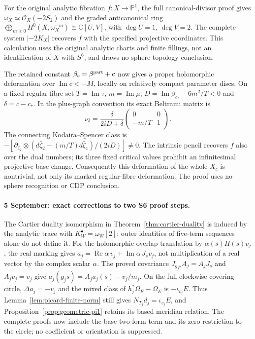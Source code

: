 For the original analytic fibration $f:X\to\mathbb P^1$, the full
canonical-divisor proof gives
$\omega_X\simeq\mathcal O_X(-2S_2)$ and the graded anticanonical ring
$\bigoplus_{m\ge0}H^0(X,\omega_X^{-m})\cong\mathbb C[U,V]$,
with $\deg U=1$, $\deg V=2$. The complete system $|-2K_X|$
recovers $f$ with the specified projective coordinates. This calculation
uses the original analytic charts and finite fillings, not an
identification of $X$ with $S^6$, and draws no sphere-topology conclusion.

The retained constant $\beta_c=\beta^{\rm part}+c$ now gives a proper
holomorphic deformation over $\operatorname{Im}c<-M$, locally on
relatively compact parameter discs. On a fixed regular fibre set
$T=\operatorname{Im}\tau$, $m=\operatorname{Im}\mu$,
$D=\operatorname{Im}\beta_{c_*}-6m^2/T<0$ and $\delta=c-c_*$.
In the plus-graph convention its exact Beltrami matrix is
\[
 \nu_\delta=\frac{\delta}{2iD+\delta}
                 \begin{pmatrix}0&0\\-m/T&1\end{pmatrix}.
\]
The connecting Kodaira--Spencer class is
$-[\partial_{\zeta_2}\otimes
(d\bar\zeta_2-(m/T)d\bar\zeta_1)/(2iD)]\ne0$.
The intrinsic pencil recovers $f$ also over the dual numbers; its three
fixed critical values prohibit an infinitesimal projective base change.
Consequently this deformation of the whole $X_c$ is nontrivial,
not only its marked regular-fibre deformation. The proof uses no sphere
recognition or CDP conclusion.



\paragraph{5 September: exact corrections to two S6 proof steps.}
The Cartier duality isomorphism in Theorem~\ref{thm:cartier-duality}
is induced by the analytic trace with $K_W^\bullet=\omega_W[2]$;
outer identities of five-term sequences alone do not define it.
For the holomorphic overlap translation by $\alpha(s)\Pi(s)v_j$,
the real marking gives
$a_j=\operatorname{Re}\alpha\,v_j+\operatorname{Im}\alpha\,J_sv_j$,
not multiplication of a real vector by the complex scalar $\alpha$.
The proved covariance $J_{g_js}A_j=A_jJ_s$ and $A_jv_j=v_j$
give $a_j(g_js)=A_ja_j(s)-v_j/m_j$. On the full clockwise
covering circle, $\Delta a_j=-v_j$ and the mixed class of
$h_j^*\Omega_E-\Omega_E$ is $-\iota_{v_j}E$.
Thus Lemma~\ref{lem:picard-finite-norm} still gives
$N_{T_j}d_j=\iota_{v_j}E$, and
Proposition~\ref{prop:geometric-pi1} retains its based meridian relation.
The complete proofs now include the base two-form term and its zero
restriction to the circle; no coefficient or orientation is suppressed.

